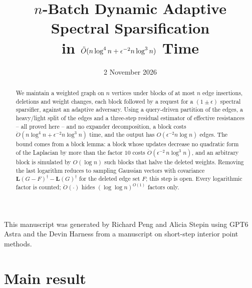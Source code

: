 \documentclass[11pt]{article}
\title{$n$-Batch Dynamic Adaptive Spectral Sparsification\\
in $\Odouble(n\log^{4}n+\epsilon^{-2}n\log^{3}n)$ Time}
\date{2 November 2026}
\author{}
\theoremstyle{remark}
\newcommand{\LL}{\mathbf L}
\newcommand{\Odouble}{\ddot{O}}
\begin{document}
\maketitle

\begin{abstract}
We maintain a weighted graph on $n$ vertices under blocks of at most $n$
edge insertions, deletions and weight changes, each block followed by a
request for a $(1\pm\epsilon)$ spectral sparsifier, against an adaptive
adversary.
Using a query-driven partition of the edges, a heavy/light split of the
edges and a three-step residual estimator of effective resistances -- all
proved here -- and no expander decomposition, a block costs
$\Odouble(n\log^{4}n+\epsilon^{-2}n\log^{3}n)$ time, and the output has
$O(\epsilon^{-2}n\log n)$ edges.
The bound comes from a block lemma: a block whose updates decrease no
quadratic form of the Laplacian by more than the factor $10$ costs
$\Odouble(\epsilon^{-2}\,n\log^{3}n)$, and an arbitrary block is simulated
by $O(\log n)$ such blocks that halve the deleted weights.
Removing the last logarithm reduces to sampling Gaussian vectors with covariance
$\LL(G-F)^{\dag}-\LL(G)^{\dag}$ for the deleted edge set $F$; this step is open.
Every logarithmic factor is counted; $\Odouble(\cdot)$ hides
$(\log\log n)^{O(1)}$ factors only.
\end{abstract}

\begin{center}\small
This manuscript was generated by Richard Peng and Alicia Stepin using GPT6
Astra and the Devin Harness from a manuscript on short-step interior point
methods.
\end{center}

\section{Main result}\label{sec:main}
\end{document}
